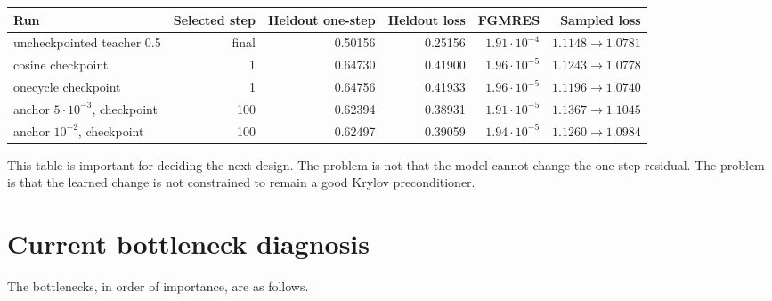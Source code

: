 \documentclass[11pt]{article}
\begin{document}
\begin{center}
\small
\begin{tabular}{lrrrrr}
\toprule
Run & Selected step & Heldout one-step & Heldout loss & FGMRES & Sampled loss \\
\midrule
uncheckpointed teacher 0.5
& final & 0.50156 & 0.25156 & \(1.91\cdot10^{-4}\) & \(1.1148\to1.0781\) \\
cosine checkpoint
& 1 & 0.64730 & 0.41900 & \(1.96\cdot10^{-5}\) & \(1.1243\to1.0778\) \\
onecycle checkpoint
& 1 & 0.64756 & 0.41933 & \(1.96\cdot10^{-5}\) & \(1.1196\to1.0740\) \\
anchor \(5\cdot10^{-3}\), checkpoint
& 100 & 0.62394 & 0.38931 & \(1.91\cdot10^{-5}\) & \(1.1367\to1.1045\) \\
anchor \(10^{-2}\), checkpoint
& 100 & 0.62497 & 0.39059 & \(1.94\cdot10^{-5}\) & \(1.1260\to1.0984\) \\
\bottomrule
\end{tabular}
\end{center}

This table is important for deciding the next design.  The problem is not that
the model cannot change the one-step residual.  The problem is that the learned
change is not constrained to remain a good Krylov preconditioner.

\section{Current bottleneck diagnosis}

The bottlenecks, in order of importance, are as follows.
\end{document}
